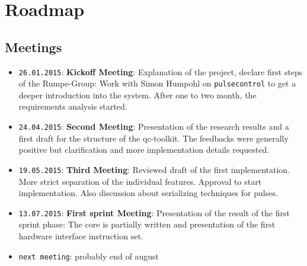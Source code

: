 \documentclass[a4paper,12pt]{article}
\begin{document}
\section{Roadmap}
\subsection{Meetings}
\begin{itemize} \itemsep-0.5pt
 \item \texttt{26.01.2015}: \textbf{Kickoff Meeting}: Explanation of the project, declare first steps of the Rumpe-Group: Work with Simon Humpohl on \texttt{pulsecontrol} to get a deeper introduction into the system. After one to two month, the requirements analysis started.
 \item \texttt{24.04.2015}: \textbf{Second Meeting}: Presentation of the research results and a first draft for the structure of the qc-toolkit. The feedbacks were generally positive but clarification and more implementation details requested.
 \item \texttt{19.05.2015}: \textbf{Third Meeting}: Reviewed draft of the first implementation. More strict separation of the individual features. Approval to start implementation. Also discussion about serializing techniques for pulses.
 \item \texttt{13.07.2015}: \textbf{First sprint Meeting}: Presentation of the result of the first sprint phase: The core is partially written and presentation of the first hardware interface instruction set.
 \item \texttt{next meeting}: probably end of august
\end{itemize}
\end{document}
